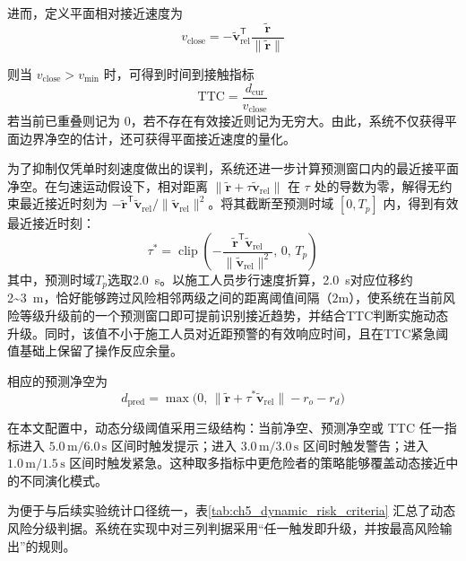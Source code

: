 进而，定义平面相对接近速度为
\begin{equation}
v_{\mathrm{close}}=-\tilde{\mathbf{v}}_{\mathrm{rel}}^\mathsf{T}\frac{\tilde{\mathbf{r}}}{\|\tilde{\mathbf{r}}\|}
\end{equation}

则当 $v_{\mathrm{close}}>v_{\min}$ 时，可得到时间到接触指标
\begin{equation}
\mathrm{TTC}=\frac{d_{\mathrm{cur}}}{v_{\mathrm{close}}}
\end{equation}
若当前已重叠则记为 $0$，若不存在有效接近则记为无穷大。由此，系统不仅获得平面边界净空的估计，还可获得平面接近速度的量化。

为了抑制仅凭单时刻速度做出的误判，系统还进一步计算预测窗口内的最近接平面净空。在匀速运动假设下，相对距离 $\|\tilde{\mathbf{r}}+\tau\tilde{\mathbf{v}}_{\mathrm{rel}}\|$ 在 $\tau$ 处的导数为零，解得无约束最近接近时刻为 $-\tilde{\mathbf{r}}^\mathsf{T}\tilde{\mathbf{v}}_{\mathrm{rel}}/\|\tilde{\mathbf{v}}_{\mathrm{rel}}\|^2$。将其截断至预测时域 $[0,T_p]$ 内，得到有效最近接近时刻：
\begin{equation}
\tau^*=\operatorname{clip}\left(-\frac{\tilde{\mathbf{r}}^\mathsf{T}\tilde{\mathbf{v}}_{\mathrm{rel}}}{\|\tilde{\mathbf{v}}_{\mathrm{rel}}\|^2},\,0,\,T_p\right)
\end{equation}
其中，预测时域$T_p$选取2.0~s。以施工人员步行速度折算，2.0~s对应位移约2\textasciitilde3~m，恰好能够跨过风险相邻两级之间的距离阈值间隔（$2\mathrm{m}$），使系统在当前风险等级升级前的一个预测窗口即可提前识别接近趋势，并结合TTC判断实施动态升级。同时，该值不小于施工人员对近距预警的有效响应时间\cite{field_experiment_2016}，且在TTC紧急阈值基础上保留了操作反应余量。

相应的预测净空为
\begin{equation}
d_{\mathrm{pred}}=\max\bigl(0,\,\|\tilde{\mathbf{r}}+\tau^*\tilde{\mathbf{v}}_{\mathrm{rel}}\|-r_o-r_d\bigr)
\end{equation}

在本文配置中，动态分级阈值采用三级结构：当前净空、预测净空或 TTC 任一指标进入 $5.0\,\mathrm{m}/6.0\,\mathrm{s}$ 区间时触发提示；进入 $3.0\,\mathrm{m}/3.0\,\mathrm{s}$ 区间时触发警告；进入 $1.0\,\mathrm{m}/1.5\,\mathrm{s}$ 区间时触发紧急。这种取多指标中更危险者的策略能够覆盖动态接近中的不同演化模式。

为便于与后续实验统计口径统一，表\ref{tab:ch5_dynamic_risk_criteria} 汇总了动态风险分级判据。系统在实现中对三列判据采用“任一触发即升级，并按最高风险输出”的规则。

